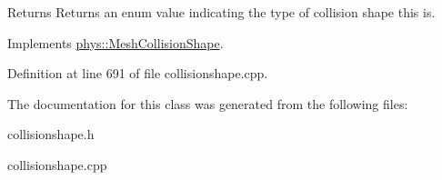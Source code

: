 \begin{DoxyReturn}{Returns}
Returns an enum value indicating the type of collision shape this is. 
\end{DoxyReturn}
 

Implements \hyperlink{classphys_1_1MeshCollisionShape_abc9d3f06df71eadb59ba93eadf6ab82f}{phys::MeshCollisionShape}.



Definition at line 691 of file collisionshape.cpp.



The documentation for this class was generated from the following files:\begin{DoxyCompactItemize}
\item 
collisionshape.h\item 
collisionshape.cpp\end{DoxyCompactItemize}
